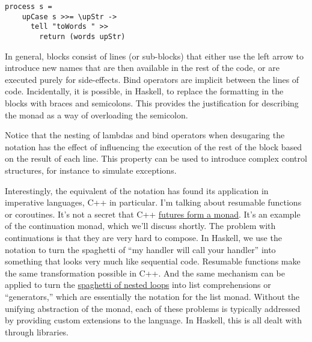 \begin{verbatim}
process s =
    upCase s >>= \upStr ->
      tell "toWords " >>
        return (words upStr)
\end{verbatim}
In general,  blocks consist of lines (or sub-blocks) that
either use the left arrow to introduce new names that are then available
in the rest of the code, or are executed purely for side-effects. Bind
operators are implicit between the lines of code. Incidentally, it is
possible, in Haskell, to replace the formatting in the 
blocks with braces and semicolons. This provides the justification for
describing the monad as a way of overloading the semicolon.

Notice that the nesting of lambdas and bind operators when desugaring
the  notation has the effect of influencing the execution of
the rest of the  block based on the result of each line. This
property can be used to introduce complex control structures, for
instance to simulate exceptions.

Interestingly, the equivalent of the  notation has found its
application in imperative languages, C++ in particular. I'm talking
about resumable functions or coroutines. It's not a secret that C++
\href{https://bartoszmilewski.com/2014/02/26/c17-i-see-a-monad-in-your-future/}{futures
form a monad}. It's an example of the continuation monad, which we'll
discuss shortly. The problem with continuations is that they are very
hard to compose. In Haskell, we use the  notation to turn the
spaghetti of ``my handler will call your handler'' into something that
looks very much like sequential code. Resumable functions make the same
transformation possible in C++. And the same mechanism can be applied to
turn the
\href{https://bartoszmilewski.com/2014/04/21/getting-lazy-with-c/}{spaghetti
of nested loops} into list comprehensions or ``generators,'' which are
essentially the  notation for the list monad. Without the
unifying abstraction of the monad, each of these problems is typically
addressed by providing custom extensions to the language. In Haskell,
this is all dealt with through libraries.